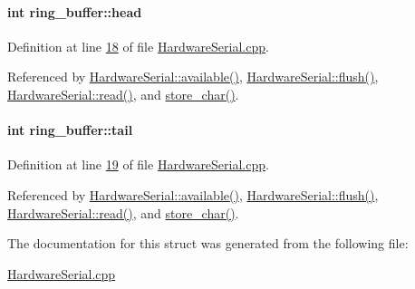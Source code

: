 \hypertarget{structring__buffer_ac1b620f2e27c3af75e68bd1645a2f5f0}{
\paragraph[{head}]{\setlength{\rightskip}{0pt plus 5cm}int {\bf ring\_\-buffer::head}}\hfill}
\label{structring__buffer_ac1b620f2e27c3af75e68bd1645a2f5f0}


Definition at line \hyperlink{_hardware_serial_8cpp_source_l00018}{18} of file \hyperlink{_hardware_serial_8cpp_source}{HardwareSerial.cpp}.



Referenced by \hyperlink{_hardware_serial_8cpp_source_l00213}{HardwareSerial::available()}, \hyperlink{_hardware_serial_8cpp_source_l00230}{HardwareSerial::flush()}, \hyperlink{_hardware_serial_8cpp_source_l00218}{HardwareSerial::read()}, and \hyperlink{_hardware_serial_8cpp_source_l00047}{store\_\-char()}.

\hypertarget{structring__buffer_a4d06965736f37f64f15bbd0ca9457771}{
\paragraph[{tail}]{\setlength{\rightskip}{0pt plus 5cm}int {\bf ring\_\-buffer::tail}}\hfill}
\label{structring__buffer_a4d06965736f37f64f15bbd0ca9457771}


Definition at line \hyperlink{_hardware_serial_8cpp_source_l00019}{19} of file \hyperlink{_hardware_serial_8cpp_source}{HardwareSerial.cpp}.



Referenced by \hyperlink{_hardware_serial_8cpp_source_l00213}{HardwareSerial::available()}, \hyperlink{_hardware_serial_8cpp_source_l00230}{HardwareSerial::flush()}, \hyperlink{_hardware_serial_8cpp_source_l00218}{HardwareSerial::read()}, and \hyperlink{_hardware_serial_8cpp_source_l00047}{store\_\-char()}.



The documentation for this struct was generated from the following file:\begin{DoxyCompactItemize}
\item 
\hyperlink{_hardware_serial_8cpp}{HardwareSerial.cpp}\end{DoxyCompactItemize}
